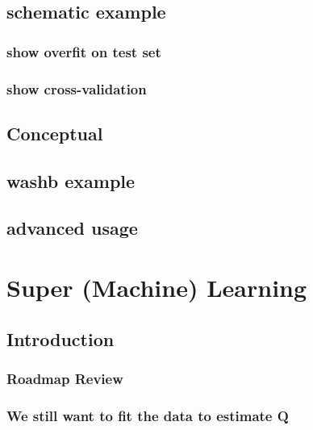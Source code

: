 \documentclass[
  12pt, krantz2,
]{krantz}
\theoremstyle{definition}
\theoremstyle{definition}
\theoremstyle{definition}
\newcommand{\1}{\mathbbm{1}}
\begin{document}
\hypertarget{schematic-example-1}{%
\section{schematic example}\label{schematic-example-1}}

\hypertarget{show-overfit-on-test-set}{%
\subsection{show overfit on test set}\label{show-overfit-on-test-set}}

\hypertarget{show-cross-validation}{%
\subsection{show cross-validation}\label{show-cross-validation}}

\hypertarget{conceptual}{%
\section{Conceptual}\label{conceptual}}

\hypertarget{washb-example}{%
\section{washb example}\label{washb-example}}

\hypertarget{advanced-usage}{%
\section{advanced usage}\label{advanced-usage}}

\hypertarget{sl3}{%
\chapter{Super (Machine) Learning}\label{sl3}}

\hypertarget{introduction-2}{%
\section{Introduction}\label{introduction-2}}

\hypertarget{roadmap-review-1}{%
\subsection{Roadmap Review}\label{roadmap-review-1}}

\hypertarget{we-still-want-to-fit-the-data-to-estimate-q}{%
\subsection{We still want to fit the data to estimate Q}\label{we-still-want-to-fit-the-data-to-estimate-q}}
\end{document}
